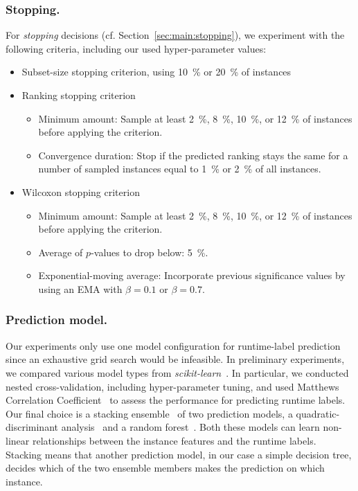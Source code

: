 \documentclass[runningheads]{llncs}
\begin{document}
\subsubsection{Stopping.}

For \emph{stopping} decisions (cf. Section~\ref{sec:main:stopping}), we experiment with the following criteria, including our used hyper-parameter values:

\begin{itemize}
  \item Subset-size stopping criterion, using \SI{10}{\%} or \SI{20}{\%} of instances
  \item Ranking stopping criterion
  \begin{itemize}
    \item Minimum amount: Sample at least \SI{2}{\%}, \SI{8}{\%}, \SI{10}{\%}, or \SI{12}{\%} of instances before applying the criterion.
    \item Convergence duration: Stop if the predicted ranking stays the same for a number of sampled instances equal to \SI{1}{\%} or \SI{2}{\%} of all instances.
  \end{itemize}

  \item Wilcoxon stopping criterion
  \begin{itemize}
    \item Minimum amount: Sample at least \SI{2}{\%}, \SI{8}{\%}, \SI{10}{\%}, or \SI{12}{\%} of instances before applying the criterion.
    \item Average of $p$-values to drop below: \SI{5}{\%}.
    \item Exponential-moving average: Incorporate previous significance values by using an EMA with $\beta = 0.1$ or $\beta = 0.7$.
  \end{itemize}
\end{itemize}

\subsubsection{Prediction model.}

Our experiments only use one model configuration for runtime-label prediction since an exhaustive grid search would be infeasible.
In preliminary experiments, we compared various model types from \emph{scikit-learn}~\cite{scikit-learn}.
In particular, we conducted nested cross-validation, including hyper-parameter tuning, and used Matthews Correlation Coefficient~\cite{gorodkin2004comparing,matthews1975comparison} to assess the performance for predicting runtime labels.
Our final choice is a stacking ensemble~\cite{wolpert1992stacked} of two prediction models, a quadratic-discriminant analysis~\cite{tharwat2016linear} and a random forest~\cite{breiman2001random}.
Both these models can learn non-linear relationships between the instance features and the runtime labels.
Stacking means that another prediction model, in our case a simple decision tree, decides which of the two ensemble members makes the prediction on which instance.
\end{document}
